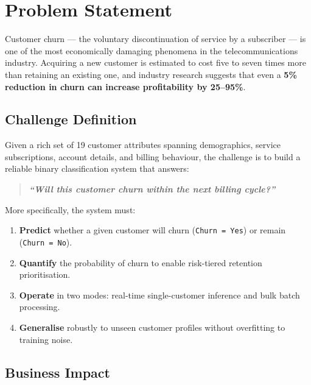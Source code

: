 \documentclass[12pt,a4paper]{article}
\begin{document}
\tableofcontents
\newpage

\section{Problem Statement}

Customer churn --- the voluntary discontinuation of service by a subscriber --- is one of the most economically damaging phenomena in the telecommunications industry. Acquiring a new customer is estimated to cost five to seven times more than retaining an existing one, and industry research suggests that even a \textbf{5\% reduction in churn can increase profitability by 25--95\%}.

\subsection{Challenge Definition}

Given a rich set of 19 customer attributes spanning demographics, service subscriptions, account details, and billing behaviour, the challenge is to build a reliable binary classification system that answers:

\begin{quote}
\itshape
\textbf{``Will this customer churn within the next billing cycle?''}
\end{quote}

More specifically, the system must:
\begin{enumerate}[leftmargin=2em]
    \item \textbf{Predict} whether a given customer will churn (\texttt{Churn = Yes}) or remain (\texttt{Churn = No}).
    \item \textbf{Quantify} the probability of churn to enable risk-tiered retention prioritisation.
    \item \textbf{Operate} in two modes: real-time single-customer inference and bulk batch processing.
    \item \textbf{Generalise} robustly to unseen customer profiles without overfitting to training noise.
\end{enumerate}

\subsection{Business Impact}
\end{document}

